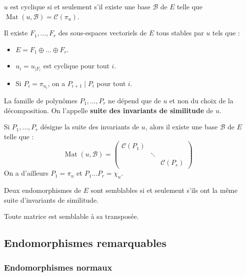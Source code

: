 	\begin{proposition}
		$u$ est cyclique si et seulement s'il existe une base $\mathcal{B}$ de $E$ telle que $\operatorname{Mat}(u, \mathcal{B}) = \mathcal{C}(\pi_u)$.
	\end{proposition}

	\begin{theorem}
		Il existe $F_1, \dots, F_r$ des sous-espaces vectoriels de $E$ tous stables par $u$ tels que :
		\begin{itemize}
			\item $E = F_1 \oplus \dots \oplus F_r$.
			\item $u_i = u_{|F_i}$ est cyclique pour tout $i$.
			\item Si $P_i = \pi_{u_i}$, on a $P_{i+1} \mid P_i$ pour tout $i$.
		\end{itemize}
		La famille de polynômes $P_1, \dots, P_r$ ne dépend que de $u$ et non du choix de la décomposition. On l'appelle \textbf{suite des invariants de similitude} de $u$.
	\end{theorem}

	\begin{theorem}
		Si $P_1, \dots, P_r$ désigne la suite des invariants de $u$, alors il existe une base $\mathcal{B}$ de $E$ telle que :
		\[ \operatorname{Mat}(u, \mathcal{B}) = \begin{pmatrix} \mathcal{C}(P_1) & & \\ & \ddots & \\ & & \mathcal{C}(P_r) \end{pmatrix} \]
		On a d'ailleurs $P_1 = \pi_u$ et $P_1 \dots P_r = \chi_u$.
	\end{theorem}

	\begin{corollary}
		Deux endomorphismes de $E$ sont semblables si et seulement s'ils ont la même suite d'invariants de similitude.
	\end{corollary}

	\begin{application}
		Toute matrice est semblable à sa transposée.
	\end{application}

	\subsection{Endomorphismes remarquables}

	\subsubsection{Endomorphismes normaux}

